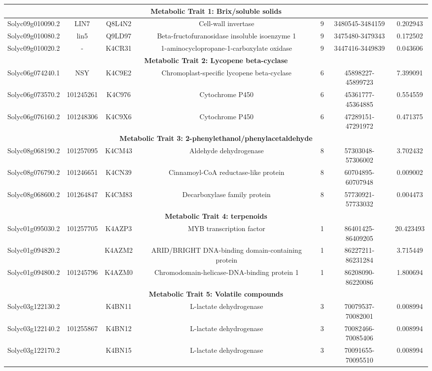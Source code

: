 \documentclass[applsci,article,accept,moreauthors,pdftex]{Definitions/mdpi}
\begin{document}
{\begin{table}[H]
{\begin{tabular}{ c  c  c  c  c  c  c }
\multicolumn{7}{c}{\textbf{Metabolic Trait 1: Brix/soluble solids}} \\
\midrule
Solyc09g010090.2 & LIN7 & Q8L4N2 & Cell-wall invertase & 9 & 3480545-3484159 & 0.202943 \\
Solyc09g010080.2 & lin5 & Q9LD97 & Beta-fructofuranosidase insoluble isoenzyme 1 & 9 & 3475480-3479343 & 0.172502 \\
Solyc09g010020.2 & - & K4CR31 & 1-aminocyclopropane-1-carboxylate oxidase & 9 & 3447416-3449839 & 0.043606 \\ %
\midrule
\multicolumn{7}{c}{\textbf{Metabolic Trait 2: Lycopene beta-cyclase}} \\
\midrule
Solyc06g074240.1 & NSY & K4C9E2 & Chromoplast-specific lycopene beta-cyclase & 6 & 45898227-45899723 & 7.399091 \\
Solyc06g073570.2 & 101245261 & K4C976 & Cytochrome P450 & 6 & 45361777-45364885 & 0.554559 \\
Solyc06g076160.2 & 101248306 & K4C9X6 & Cytochrome P450 & 6 & 47289151-47291972 & 0.471375 \\%
\midrule
\multicolumn{7}{c}{\textbf{Metabolic Trait 3: 2-phenylethanol/phenylacetaldehyde}} \\
\midrule
Solyc08g068190.2 & 101257095 & K4CM43 & Aldehyde dehydrogenase & 8 & 57303048-57306002 & 3.702432 \\ 
Solyc08g076790.2 & 101246651 & K4CN39 & Cinnamoyl-CoA reductase-like protein & 8 & 60704895-60707948 & 0.009002 \\ 
Solyc08g068600.2 & 101264847 & K4CM83 & Decarboxylase family protein & 8 & 57730921-57733032 & 0.004473 \\%
\midrule
\multicolumn{7}{c}{\textbf{Metabolic Trait 4: terpenoids}} \\
\midrule
Solyc01g095030.2 & 101257705 & K4AZP3 & MYB transcription factor & 1 & 86401425-86409205 & 20.423493 \\ 
Solyc01g094820.2 &  & K4AZM2 & ARID/BRIGHT DNA-binding domain-containing protein & 1 & 86227211-86231284 & 3.715449 \\ 
Solyc01g094800.2 & 101245796 & K4AZM0 & Chromodomain-helicase-DNA-binding protein 1 & 1 & 86208090-86220086 & 1.800694 \\%
\midrule
\multicolumn{7}{c}{\textbf{Metabolic Trait 5: Volatile compounds}} \\
\midrule
Solyc03g122130.2 &  & K4BN11 & L-lactate dehydrogenase & 3 & 70079537-70082001 & 0.008994 \\ 
Solyc03g122140.2 & 101255867 & K4BN12 & L-lactate dehydrogenase & 3 & 70082466-70085406 & 0.008994 \\ 
Solyc03g122170.2 &  & K4BN15 & L-lactate dehydrogenase & 3 & 70091655-70095510 & 0.008994 \\ %
\bottomrule
\end{tabular}
}
\end{table}

}
\end{document}
